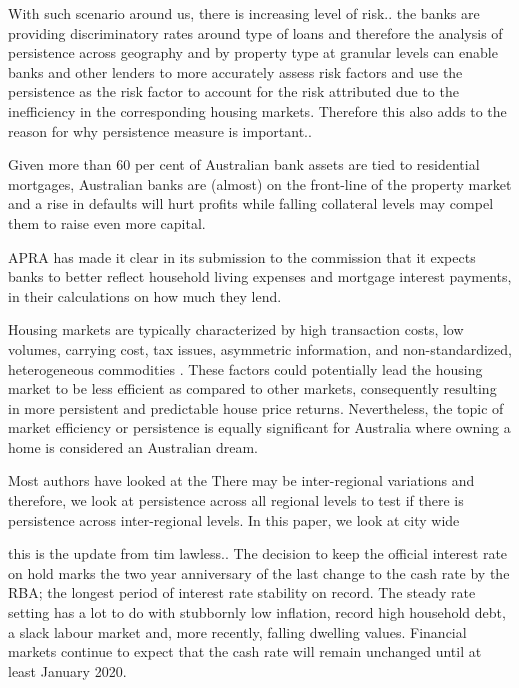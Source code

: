 \documentclass[AEJ,reqno, draftmode]{AEA}
\begin{document}
With such scenario around us, there is increasing level of risk.. the banks are providing discriminatory rates around type of loans and therefore the analysis of persistence across geography and by property type at granular levels can enable banks and other lenders to more accurately assess risk factors and use the persistence as the risk factor to account for the risk attributed due to the inefficiency in the corresponding housing markets. Therefore this also adds to the reason for why persistence measure is important..


Given more than 60 per cent of Australian bank assets are tied to residential mortgages, Australian banks are (almost) on the front-line of the property market and a rise in defaults will hurt profits while falling collateral levels may compel them to raise even more capital.  

APRA has made it clear in its submission to the commission that it expects banks to better reflect household living expenses and mortgage interest payments, in their calculations on how much they lend.

Housing markets are typically characterized by high transaction costs, low volumes, carrying cost, tax issues, asymmetric information, and non-standardized, heterogeneous commodities \citet{schindler2014persistence}. These factors could potentially lead the housing market to be less efficient as compared to other markets, consequently resulting in more persistent and predictable house price returns. Nevertheless, the topic of market efficiency or persistence is equally significant for Australia where owning a home is considered an Australian dream. 

Most authors have looked at the 
 There may be inter-regional variations and therefore, we look at persistence across all regional levels to test if there is persistence across inter-regional levels.
In this paper, we look at city wide

this is the update from tim lawless..
The decision to keep the official interest rate on hold marks the two year anniversary of the last change to the cash rate by the RBA; the longest period of interest rate stability on record.  The steady rate setting has a lot to do with stubbornly low inflation, record high household debt, a slack labour market and, more recently, falling dwelling values.  Financial markets continue to expect that the cash rate will remain unchanged until at least January 2020. 
 
\end{document}
